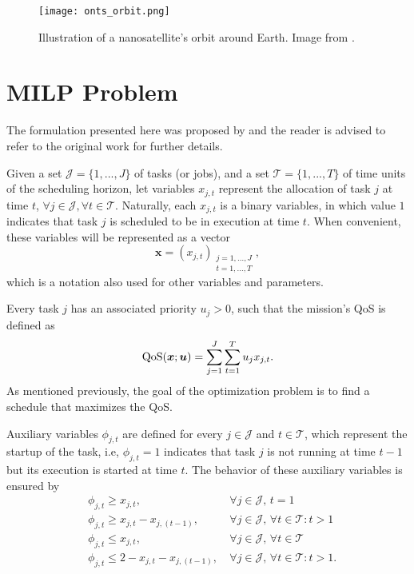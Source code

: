 \begin{figure}[h]
    \centering
    \texttt{[image: onts\_orbit.png]}
    \caption{Illustration of a nanosatellite's orbit around Earth. Image from .}
    \label{fig:onts-orbit}
\end{figure}


\section{MILP Problem}

The formulation presented here was proposed by  and the reader is advised to refer to the original work for further details.

Given a set $\mathcal{J}=\{1,...,J\}$ of tasks (or jobs), and a set $\mathcal{T}=\{1,...,T\}$ of time units of the scheduling horizon, let variables $x_{j,t}$ represent the allocation of task $j$ at time $t$, $\forall j\in \mathcal{J}, \forall t\in \mathcal{T}$.
Naturally, each $x_{j,t}$ is a binary variables, in which value $1$ indicates that task $j$ is scheduled to be in execution at time $t$.
When convenient, these variables will be represented as a vector \[
    \bm{x} = \left( x_{j,t} \right)_{\substack{j=1,\ldots,J\\ t=1,\ldots,T}}
,\] which is a notation also used for other variables and parameters.

Every task $j$ has an associated priority $u_j > 0$, such that the mission's QoS is defined as
\begin{equation}\label{eq:qos}
    {\rm QoS}(\bm{x};\bm{u}) = \sum_{j=1}^{J} \sum_{t=1}^{T} {u}_{j} x_{j,t}
.\end{equation}
As mentioned previously, the goal of the optimization problem is to find a schedule that maximizes the QoS.

Auxiliary variables $\phi_{j,t}$ are defined for every $j\in \mathcal{J}$ and $t\in \mathcal{T}$, which represent the startup of the task, i.e, $\phi_{j,t} = 1$ indicates that task $j$ is not running at time $t-1$ but its execution is started at time $t$.
The behavior of these auxiliary variables is ensured by
\begin{equation}\label{eq:phi-constraints}
    \begin{aligned}
	& \phi_{j,t} \geq x_{j,t}, &~\forall j\in\mathcal{J},\, t = 1  \\
        & \phi_{j,t} \geq x_{j,t} - x_{j,(t-1)}, &~\forall j\in\mathcal{J}, \,\forall t\in\mathcal{T}: t > 1   \\
        & \phi_{j,t} \leq x_{j,t}, &~\forall j\in\mathcal{J}, \,\forall t\in\mathcal{T}   \\
        & \phi_{j,t} \leq 2 - x_{j,t} - x_{j,(t-1)}, &~\forall j\in\mathcal{J}, \,\forall t\in\mathcal{T}: t > 1
    .\end{aligned}
\end{equation}

